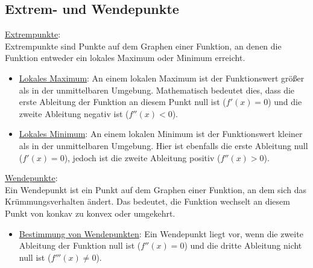 \subsection{Extrem- und Wendepunkte}
\underline{Extrempunkte}: \\
Extrempunkte sind Punkte auf dem Graphen einer Funktion, 
an denen die Funktion entweder ein lokales Maximum oder Minimum erreicht.
\begin{itemize}
    \item \underline{Lokales Maximum}: 
        An einem lokalen Maximum ist der Funktionswert größer als in der unmittelbaren Umgebung. Mathematisch bedeutet dies, 
        dass die erste Ableitung der Funktion an diesem Punkt null ist ($f'(x)=0$) und die zweite Ableitung negativ ist ($f''(x)<0$).
    \item \underline{Lokales Minimum}: 
        An einem lokalen Minimum ist der Funktionswert kleiner als in der unmittelbaren Umgebung. 
        Hier ist ebenfalls die erste Ableitung null ($f'(x)=0$), 
        jedoch ist die zweite Ableitung positiv ($f''(x)>0$).
\end{itemize} 
\secspacebig
\underline{Wendepunkte}: \\
Ein Wendepunkt ist ein Punkt auf dem Graphen einer Funktion, 
an dem sich das Krümmungsverhalten ändert. 
Das bedeutet, die Funktion wechselt an diesem Punkt von konkav zu konvex oder umgekehrt.
\begin{itemize}
    \item \underline{Bestimmung von Wendepunkten}: 
        Ein Wendepunkt liegt vor, 
        wenn die zweite Ableitung der Funktion null ist ($f''(x)=0$) und die dritte Ableitung nicht null ist ($f'''(x)\neq 0$). 
\end{itemize}
